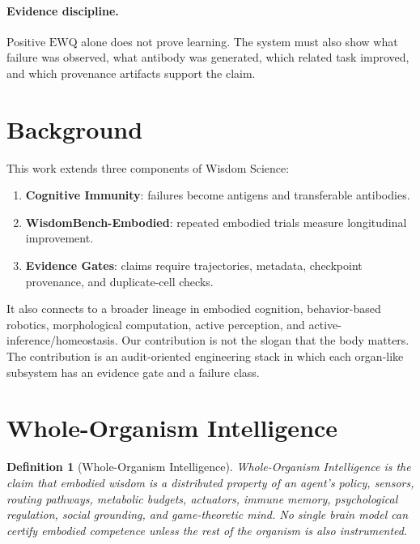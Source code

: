 \documentclass[11pt]{article}
\newtheorem{definition}{Definition}
\begin{document}
\paragraph{Evidence discipline.}
Positive $\mathrm{EWQ}$ alone does not prove learning.
The system must also show what failure was observed, what antibody was generated, which related task improved, and which provenance artifacts support the claim.

\section{Background}

This work extends three components of Wisdom Science:
\begin{enumerate}[leftmargin=*]
  \item \textbf{Cognitive Immunity}: failures become antigens and transferable antibodies.
  \item \textbf{WisdomBench-Embodied}: repeated embodied trials measure longitudinal improvement.
  \item \textbf{Evidence Gates}: claims require trajectories, metadata, checkpoint provenance, and duplicate-cell checks.
\end{enumerate}

It also connects to a broader lineage in embodied cognition, behavior-based robotics, morphological computation, active perception, and active-inference/homeostasis.
Our contribution is not the slogan that the body matters.
The contribution is an audit-oriented engineering stack in which each organ-like subsystem has an evidence gate and a failure class.

\section{Whole-Organism Intelligence}

\begin{definition}[Whole-Organism Intelligence]
Whole-Organism Intelligence is the claim that embodied wisdom is a distributed property of an agent's policy, sensors, routing pathways, metabolic budgets, actuators, immune memory, psychological regulation, social grounding, and game-theoretic mind.
No single brain model can certify embodied competence unless the rest of the organism is also instrumented.
\end{definition}

\begin{table}[t]
\centering
\scriptsize
\caption{Whole-Organism Intelligence schema. The layers are generated from \texttt{whole\_organism\_intelligence\_v0.json}; each layer names a biological analogy, engineering substrate, and evidence gate.}
\label{tab:whole_organism}

\end{table}
\end{document}
